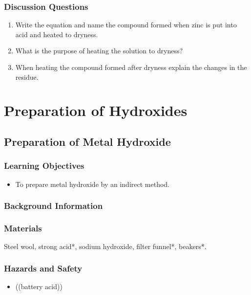 \subsubsection*{Discussion Questions}
\begin{enumerate}
\item{Write the equation and name the compound formed when zinc is put into acid and heated to dryness.}
\item{What is the purpose of heating the solution to dryness?}
\item{When heating the compound formed after dryness explain the changes in the residue.}
\end{enumerate}

\section{Preparation of Hydroxides}

\subsection{Preparation of Metal Hydroxide}

\subsubsection*{Learning Objectives}
\begin{itemize}
\item{To prepare metal hydroxide by an indirect method.}
\end{itemize}

\subsubsection*{Background Information}


\subsubsection*{Materials}
Steel wool, strong acid*, sodium hydroxide, filter funnel*, beakers*.

\subsubsection*{Hazards and Safety}
\begin{itemize}
\item{((battery acid))}
\end{itemize}

